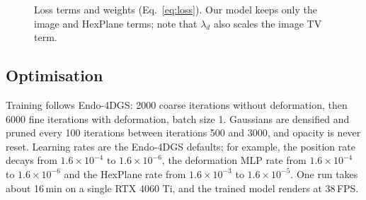 \documentclass[conference]{IEEEtran}
\begin{document}
\begin{figure}[t]
\centering
{}
\caption{Loss terms and weights (Eq.~\ref{eq:loss}). Our model keeps only the image and HexPlane terms; note that $\lambda_d$ also scales the image TV term.}
\label{fig:loss}
\end{figure}

\subsection{Optimisation}
Training follows Endo-4DGS: 2000 coarse iterations without deformation, then 6000 fine iterations with deformation, batch size 1. Gaussians are densified and pruned every 100 iterations between iterations 500 and 3000, and opacity is never reset. Learning rates are the Endo-4DGS defaults; for example, the position rate decays from $1.6{\times}10^{-4}$ to $1.6{\times}10^{-6}$, the deformation MLP rate from $1.6{\times}10^{-4}$ to $1.6{\times}10^{-6}$ and the HexPlane rate from $1.6{\times}10^{-3}$ to $1.6{\times}10^{-5}$. One run takes about 16\,min on a single RTX 4060 Ti, and the trained model renders at 38\,FPS.
\end{document}
